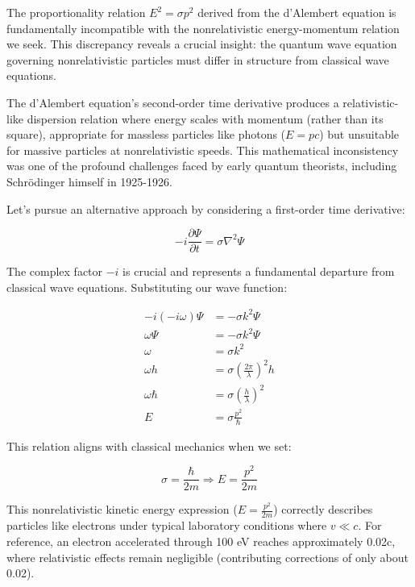 \documentclass[italian]{HKNdocument}
\begin{document}
The proportionality relation $E^2 = \sigma p^2$ derived from the d'Alembert equation is fundamentally incompatible with the nonrelativistic energy-momentum relation we seek. This discrepancy reveals a crucial insight: the quantum wave equation governing nonrelativistic particles must differ in structure from classical wave equations.

The d'Alembert equation's second-order time derivative produces a relativistic-like dispersion relation where energy scales with momentum (rather than its square), appropriate for massless particles like photons ($E = pc$) but unsuitable for massive particles at nonrelativistic speeds. This mathematical inconsistency was one of the profound challenges faced by early quantum theorists, including Schrödinger himself in 1925-1926.

Let's pursue an alternative approach by considering a first-order time derivative:

\begin{equation}
-i \frac{\partial \Psi}{\partial t}=\sigma \nabla^{2} \Psi \label{eq:1.4}
\end{equation}

The complex factor $-i$ is crucial and represents a fundamental departure from classical wave equations. Substituting our wave function:

\begin{align}
-i(-i\omega) \Psi & =-\sigma k^{2} \Psi \\
\omega \Psi & =-\sigma k^{2} \Psi \\
\omega & =\sigma k^{2} \\
\omega h & =\sigma\left(\frac{2 \pi}{\lambda}\right)^{2} h  \label{eq:1.5}\\
\omega \hbar & =\sigma\left(\frac{h}{\lambda}\right)^{2} \\
E & =\sigma \frac{p^{2}}{\hbar}
\end{align}

This relation aligns with classical mechanics when we set:

\begin{equation}
\sigma=\frac{\hbar}{2 m} \Rightarrow E=\frac{p^{2}}{2 m} \label{eq:1.6}
\end{equation}

This nonrelativistic kinetic energy expression ($E=\frac{p^2}{2m}$) correctly describes particles like electrons under typical laboratory conditions where $v \ll c$. For reference, an electron accelerated through 100 eV reaches approximately 0.02c, where relativistic effects remain negligible (contributing corrections of only about 0.02).
\end{document}
